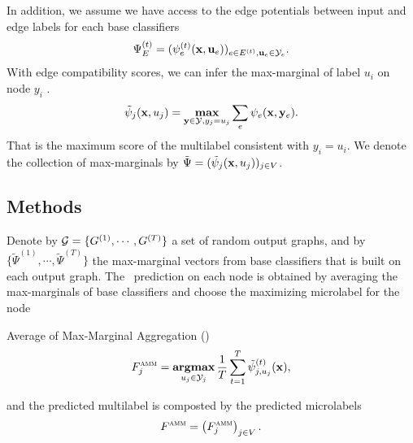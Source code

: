 {%
In addition, we assume we have access to the edge potentials between input and edge labels for each base classifiers
\begin{align*}
	\Psi_E^{(t)} = (\psi_e^{(t)}(\mathbf {x},\mathbf {u}_e))_{e\in E^{(t)},\mathbf {u}_e\in\mathcal{Y}_e}.
\end{align*}
With edge compatibility scores, we can infer the max-marginal of label $u_i$ on node $y_i$ \citep{Wainwright05map}.
\begin{align*}
	\tilde{\psi}_j(\mathbf {x},u_j) = \underset{\mathbf {y}\in\mathcal{Y},y_j=u_j}{\textbf{max}}\sum_{e}\psi_e(\mathbf {x},\mathbf {y}_e).
\end{align*}
That is the maximum score of the multilabel consistent with $y_i=u_i$.
We denote the collection of max-marginals by $\tilde{\Psi} = (\tilde{\psi}_j(\mathbf {x},u_j))_{j\in V}$.

\subsection{Methods}

Denote by  $\mathcal{G}=\{G^{(1)},\cdots,G^{(T)}\}$ a set of random output graphs, and by $\{\tilde{\Psi}^{(1)},\cdots,\tilde{\Psi}^{(T)}\}$ the max-marginal vectors from base classifiers that is built on each output graph.
The \amm\ prediction on each node is obtained by averaging the max-marginals of base classifiers and choose the maximizing microlabel for the node
\begin{definition}{Average of Max-Marginal Aggregation (\amm)}
	\begin{align*}
	F_j^{\text{{\sc amm}}}=\underset{u_j\in\mathcal{Y}_j}{\textbf{argmax}}\,\frac{1}{T}\sum_{t=1}^{T}\tilde{\psi}_{j,u_j}^{(t)}(\mathbf {x}),
	\end{align*}
\end{definition}
and the predicted multilabel is composted by the predicted microlabels
\begin{align*}
	F^{\text{{\sc amm}}}=\left(F_j^{\text{{\sc amm}}}\right)_{j\in V}.
\end{align*}

}
